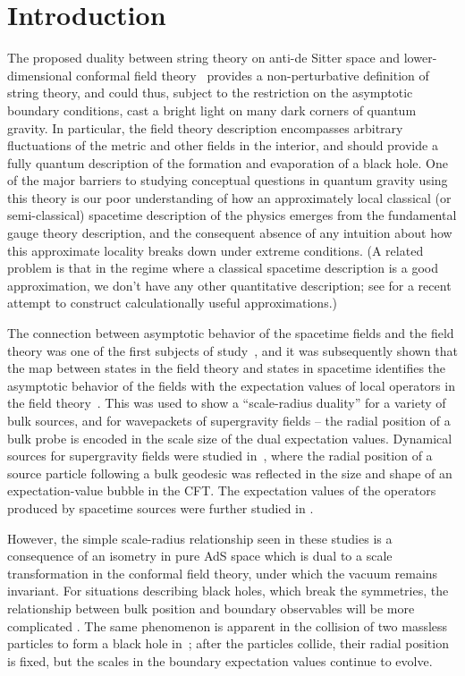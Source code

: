 \documentclass[a4paper,12pt]{article}
\begin{document}
\section{Introduction}

The proposed duality between string theory on anti-de Sitter space and
lower-dimensional conformal field theory~\cite{juanads} provides a
non-perturbative definition of string theory, and could thus, subject
to the restriction on the asymptotic boundary conditions, cast a
bright light on many dark corners of quantum gravity. In particular,
the field theory description encompasses arbitrary fluctuations of the
metric and other fields in the interior, and should provide a fully
quantum description of the formation and evaporation of a black hole.
One of the major barriers to studying conceptual questions in quantum
gravity using this theory is our poor understanding of how an
approximately local classical (or semi-classical) spacetime
description of the physics emerges from the fundamental gauge theory
description, and the consequent absence of any intuition about how
this approximate locality breaks down under extreme conditions. (A
related problem is that in the regime where a classical spacetime
description is a good approximation, we don't have any other
quantitative description; see \cite{kabat:approx} for a recent attempt
to construct calculationally useful approximations.)

The connection between asymptotic behavior of the spacetime fields and
the field theory was one of the first subjects of
study~\cite{witten,gkp}, and it was subsequently shown that the map
between states in the field theory and states in spacetime identifies
the asymptotic behavior of the fields with the expectation values of
local operators in the field theory~\cite{bklt}.  This was used to
show a ``scale-radius duality'' for a variety of bulk sources, and for
wavepackets of supergravity fields -- the radial position of a bulk
probe is encoded in the scale size of the dual expectation values.
Dynamical sources for supergravity fields were studied in~\cite{dkk},
where the radial position of a source particle following a bulk
geodesic was reflected in the size and shape of an expectation-value
bubble in the CFT.  The expectation values of the operators produced
by spacetime sources were further studied in
\cite{bdhm,esko1,amanda,garysunny,bakrey,sumit1,joeetal}.

However, the simple scale-radius relationship seen in these studies is
a consequence of an isometry in pure AdS space which is dual to a
scale transformation in the conformal field theory, under which the
vacuum remains invariant.  For situations describing black holes,
which break the symmetries, the relationship between bulk position and
boundary observables will be more complicated \cite{dkk,cons:glue}.
The same phenomenon is apparent in the collision of two massless
particles to form a black hole in~\cite{joeetal}; after the particles
collide, their radial position is fixed, but the scales in the
boundary expectation values continue to evolve.
\end{document}
